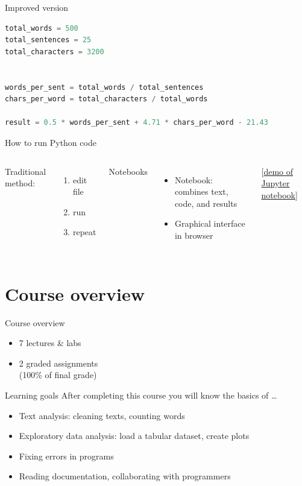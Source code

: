 \documentclass[aspectratio=169,usenames,dvipsnames]{beamer}
\begin{document}
\begin{frame}[fragile]{Improved version}
\begin{lstlisting}[language=python]
total_words = 500
total_sentences = 25
total_characters = 3200


words_per_sent = total_words / total_sentences
chars_per_word = total_characters / total_words

result = 0.5 * words_per_sent + 4.71 * chars_per_word - 21.43
\end{lstlisting}
\end{frame}


\begin{frame}{How to run Python code}
	\begin{columns}
			Traditional method:
			\begin{enumerate}
				\item edit file
				\item run
				\item repeat
			\end{enumerate}
			Notebooks
			\begin{itemize}
				\item Notebook: combines text, code, and results
				\item Graphical interface in browser
			\end{itemize}
            [\href{http://mybinder.org/v2/gh/binder-examples/requirements/master}{demo of Jupyter notebook}]
	\end{columns}
\end{frame}



\section{Course overview}
\frame{\tableofcontents[currentsection]}

\begin{frame}{Course overview}
    \begin{itemize}
       \item 7 lectures \& labs
       \item 2 graded assignments \\
           (100\% of final grade)
    \end{itemize}
\end{frame}

\begin{frame}{Learning goals}
    After completing this course you will know the basics of \dots
    \begin{itemize}
        \item Text analysis: cleaning texts, counting words
        \item Exploratory data analysis: load a tabular dataset, create plots
        \item Fixing errors in programs
        \item Reading documentation, collaborating with programmers
    \end{itemize}
\end{frame}
\end{document}
